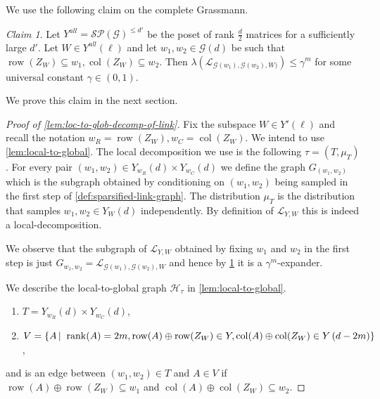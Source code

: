 \documentclass[10pt,a4paper]{article}
\newcommand{\prettyref}[1]{\cref{#1}}
\theoremstyle{definition}
\theoremstyle{remark}
\newtheorem{claim}[theorem]{Claim}
\newcommand\sett[2]{\left\{ #1 \left| \; \vphantom{#1 #2} \right. #2  \right\}}
\DeclareMathOperator{\rank}{rank}
\DeclareMathOperator{\row}{row}
\DeclareMathOperator{\col}{col}
\renewcommand{\leq}{\leqslant}
\numberwithin{equation}{section}
\let\pref=\prettyref
\def\Gr{\mathcal{G}}
\def\Y{Y}
\def\SL{\mathcal{L}}
\def\T{T}
\def\B{\mathcal{H}}
\def\diml{d}
\def\dimlin{{\diml}}
\def\dimlout{\diml'}
\def\dimm{\ell}
\def\M{\mathcal{SP}}
\def\Mgras{Y^{all}}
\begin{document}
We use the following claim on the complete Grassmann.
\begin{claim} \label{claim:expansion-no-maximal-matrix-graph}
    Let \(\Mgras=\M(\Gr)^{\leq \dimlout}\) be the poset of rank \(\frac{\dimlin}{2}\) matrices for a sufficiently large \(\dimlout\). Let \(W \in \Mgras(\dimm)\) and let \(w_1,w_2 \in \Gr(\dimlin)\) be such that \(\row(Z_W) \subseteq w_1, \col(Z_W) \subseteq w_2\). Then \(\lambda(\SL_{\Gr(w_1),\Gr(w_2),W)}) \leq \gamma^{m}\) for some universal constant \(\gamma \in (0,1)\). 
\end{claim}
We prove this claim in the next section.

\begin{proof}[Proof of \pref{lem:loc-to-glob-decomp-of-link}]
    Fix the subspace \(W \in \Y'(\dimm)\) and recall the notation \(w_R = \row(Z_W), w_C = \col(Z_W)\). We intend to use \pref{lem:local-to-global}. The local decomposition we use is the following \(\tau = (\T,\mu_\T)\). For every pair \((w_1,w_2) \in \Y_{w_R}(\dimlin) \times \Y_{w_C}(\dimlin)\) we define the graph \(G_{(w_1,w_2)}\) which is the subgraph obtained by conditioning on \((w_1,w_2)\) being sampled in the first step of \pref{def:sparsified-link-graph}. The distribution \(\mu_\T\) is the distribution that samples \(w_1,w_2 \in \Y_W(\dimlin)\) independently. By definition of \(\SL_{\Y,W}\) this is indeed a local-decomposition.
    
    We observe that the subgraph of \(\SL_{\Y,W}\) obtained by fixing \(w_1\) and \(w_2\) in the first step is just \(G_{w_1,w_2} = \SL_{\Gr(w_1),\Gr(w_2),W}\) and hence by \pref{claim:expansion-no-maximal-matrix-graph} it is a \(\gamma^{ m}\)-expander. 
    
    We describe the local-to-global graph \(\B_\tau\) in \pref{lem:local-to-global}.
    \begin{enumerate}
        \item \(\T = \Y_{w_R}(\dimlin) \times \Y_{w_C}(\dimlin)\),
        \item \(V = \sett{A}{\rank(A) = 2m, \row(A) \oplus \row(Z_W) \in \Y, \col(A) \oplus \col(Z_W) \in \Y \left ( \dimlin - 2m \right )}\),
    \end{enumerate}
    and is an edge between \((w_1,w_2) \in \T\) and \(A \in V\) if \(\row(A) \oplus \row(Z_W) \subseteq w_1\) and \(\col(A) \oplus \col(Z_W) \subseteq w_2\).
    

\end{proof}
\end{document}
